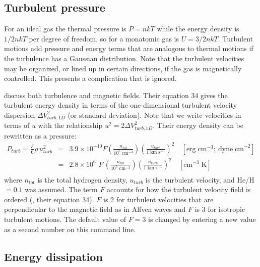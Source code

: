 \subsection{Turbulent pressure}

For an ideal gas the thermal pressure is $P = nkT$
while the energy density is $1/2 nkT$
per degree of freedom, so for a monatomic gas is $U = 3/2 nkT$.
Turbulent motions add pressure and energy terms that are analogous
to thermal motions if the turbulence has a Gaussian distribution.
Note
that the turbulent velocities may be organized, or lined up in certain
directions, if the gas is magnetically controlled.
This presents a
complication that is ignored.

\citet{HeilesTroland2005} discuss both turbulence and magnetic fields.
Their equation 34 gives the turbulent energy density in terms of the
one-dimensional turbulent velocity dispersion $\Delta V_{turb,1D}^2 $
(or standard deviation).
Note that we write velocities in terms of $u$
with the relationship $u^2  = 2\Delta V_{turb,1D}^2 $.
Their energy density can be rewritten as a pressure:
\begin{equation}
\begin{array}{ccl}
 P_{turb}  = \frac{F}{6}\rho \,u_{turb}^2&  =& 3.9 \times 10^{ - 10} F\left(
{\frac{{n_{tot} }}{{10^5 \;{\mathrm{cm}}^{ - 3} }}} \right)\left(
{\frac{{u_{turb} }}{{1\;{\mathrm{km}}\;{\mathrm{s}}^{ - 1} }}} \right)^2 \quad \left[
{{\mathrm{erg\; cm}}^{{\mathrm{ - 3}}} {\mathrm{;\ dyne\; cm}}^{ - 2}} \right] \\
&  =& 2.8 \times 10^6 \,\,F\,\left( {\frac{{n_{tot} }}{{10^5 \;{\mathrm{cm}}^{
- 3} }}} \right)\left( {\frac{{u_{turb} }}{{1\;{\mathrm{km}}\;{\mathrm{s}}^{ - 1}
}}} \right)^2 \quad \left[ {{\mathrm{cm}}^{ - 3} \;{\mathrm{K}}} \right] \\
 \end{array}
\end{equation}
where $n_{tot}$ is the total hydrogen density,
$u_{turb}$ is the turbulent velocity,
and He/H$ = 0.1$ was assumed.
The term $F$ accounts for how the turbulent
velocity field is ordered (\citealp{HeilesTroland2005}, their equation 34).
$F$ is 2 for turbulent velocities that are perpendicular to
the magnetic field
as in Alfven waves and $F$ is 3 for isotropic turbulent motions.
The default
value of $F = 3$ is changed by entering a new value as a second number on
this command line.

\subsection{Energy dissipation}

